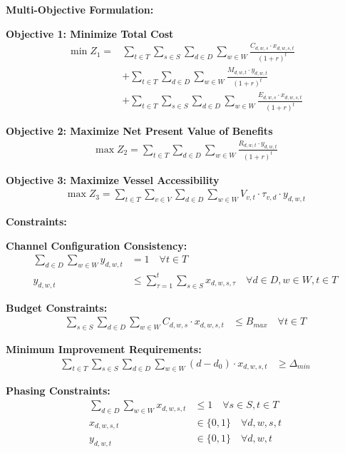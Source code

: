 \documentclass{article}
\begin{document}
\textbf{Multi-Objective Formulation:}

\textbf{Objective 1: Minimize Total Cost}
\begin{align}
\min Z_1 = &\sum_{t \in T} \sum_{s \in S} \sum_{d \in D} \sum_{w \in W} \frac{C_{d,w,s} \cdot x_{d,w,s,t}}{(1+r)^t} \\
&+ \sum_{t \in T} \sum_{d \in D} \sum_{w \in W} \frac{M_{d,w,t} \cdot y_{d,w,t}}{(1+r)^t} \\
&+ \sum_{t \in T} \sum_{s \in S} \sum_{d \in D} \sum_{w \in W} \frac{E_{d,w,s} \cdot x_{d,w,s,t}}{(1+r)^t}
\end{align}

\textbf{Objective 2: Maximize Net Present Value of Benefits}
\begin{align}
\max Z_2 = \sum_{t \in T} \sum_{d \in D} \sum_{w \in W} \frac{R_{d,w,t} \cdot y_{d,w,t}}{(1+r)^t}
\end{align}

\textbf{Objective 3: Maximize Vessel Accessibility}
\begin{align}
\max Z_3 = \sum_{t \in T} \sum_{v \in V} \sum_{d \in D} \sum_{w \in W} V_{v,t} \cdot \tau_{v,d} \cdot y_{d,w,t}
\end{align}

\textbf{Constraints:}

\textbf{Channel Configuration Consistency:}
\begin{align}
\sum_{d \in D} \sum_{w \in W} y_{d,w,t} &= 1 \quad \forall t \in T \\
y_{d,w,t} &\leq \sum_{\tau=1}^{t} \sum_{s \in S} x_{d,w,s,\tau} \quad \forall d \in D, w \in W, t \in T
\end{align}

\textbf{Budget Constraints:}
\begin{align}
\sum_{s \in S} \sum_{d \in D} \sum_{w \in W} C_{d,w,s} \cdot x_{d,w,s,t} &\leq B_{max} \quad \forall t \in T
\end{align}

\textbf{Minimum Improvement Requirements:}
\begin{align}
\sum_{t \in T} \sum_{s \in S} \sum_{d \in D} \sum_{w \in W} (d - d_0) \cdot x_{d,w,s,t} &\geq \Delta_{min}
\end{align}

\textbf{Phasing Constraints:}
\begin{align}
\sum_{d \in D} \sum_{w \in W} x_{d,w,s,t} &\leq 1 \quad \forall s \in S, t \in T \\
x_{d,w,s,t} &\in \{0, 1\} \quad \forall d,w,s,t \\
y_{d,w,t} &\in \{0, 1\} \quad \forall d,w,t
\end{align}
\end{document}
